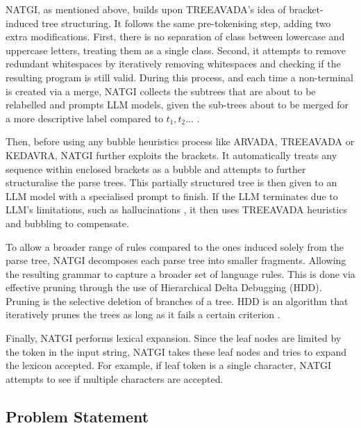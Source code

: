 \vspace{\baselineskip}

NATGI, as mentioned above, builds upon TREEAVADA's idea of bracket-induced tree structuring. It follows the same pre-tokenising step, adding two extra modifications. First, there is no separation of class between lowercase and uppercase letters, treating them as a single class. Second, it attempts to remove redundant whitespaces by iteratively removing whitespaces and checking if the resulting program is still valid. During this process, and each time a non-terminal is created via a merge, NATGI collects the subtrees that are about to be relabelled and prompts LLM models, given the sub-trees about to be merged for a more descriptive label compared to $t_1, t_2 ...$ .

\vspace{\baselineskip}
Then, before using any bubble heuristics process like ARVADA, TREEAVADA or KEDAVRA, NATGI further exploits the brackets. It automatically treats any sequence within enclosed brackets as a bubble and attempts to further structuralise the parse trees. This partially structured tree is then given to an LLM model with a specialised prompt to finish. If the LLM terminates due to LLM's limitations, such as hallucinations \cite{orvalhoAreLargeLanguage2025a,arefinBlackboxContextfreeGrammar2025}, it then uses TREEAVADA heuristics and bubbling to compensate.

\vspace{\baselineskip}
To allow a broader range of rules compared to the ones induced solely from the parse tree, NATGI decomposes each parse tree into smaller fragments. Allowing the resulting grammar to capture a broader set of language rules. This is done via effective pruning through the use of Hierarchical Delta Debugging (HDD). Pruning is the selective deletion of branches of a tree. HDD is an algorithm that iteratively prunes the trees as long as it fails a certain criterion \cite{misherghiHDDHierarchicalDelta2006a}. 

\vspace{\baselineskip}
Finally, NATGI performs lexical expansion. Since the leaf nodes are limited by the token in the input string, NATGI takes these leaf nodes and tries to expand the lexicon accepted. For example, if leaf token is a single character, NATGI attempts to see if multiple characters are accepted.


\subsection{Problem Statement}

